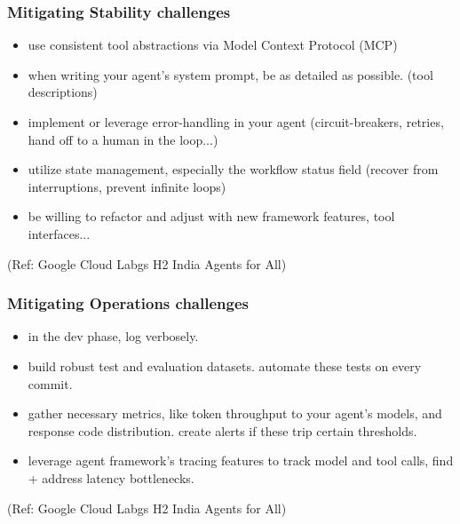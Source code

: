 \begin{frame}[fragile]\frametitle{Mitigating Stability challenges}
    \begin{itemize}
        \item use consistent tool abstractions via Model Context Protocol (MCP)
        \item when writing your agent’s system prompt, be as detailed as possible. (tool descriptions)
        \item implement or leverage error-handling in your agent (circuit-breakers, retries, hand off to a human in the loop...)
        \item utilize state management, especially the workflow status field (recover from interruptions, prevent infinite loops) 
        \item be willing to refactor and adjust with new framework features, tool interfaces... 
    \end{itemize}
	
		{\tiny (Ref: Google Cloud Labgs H2 India Agents for All)}

\end{frame}

\begin{frame}[fragile]\frametitle{Mitigating Operations challenges}
    \begin{itemize}
        \item in the dev phase, log verbosely.
        \item build robust test and evaluation datasets. automate these tests on every commit.
        \item gather necessary metrics, like token throughput to your agent’s models, and response code distribution. create alerts if these trip certain thresholds.
        \item leverage agent framework’s tracing features to track model and tool calls, find + address latency bottlenecks.
    \end{itemize}
	
		{\tiny (Ref: Google Cloud Labgs H2 India Agents for All)}

\end{frame}

